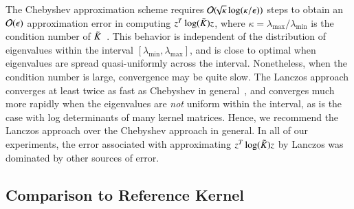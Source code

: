 The Chebyshev approximation scheme requires $\mathcal{O}(\!\!\sqrt{\kappa}
\log(\kappa/\epsilon))$ steps to obtain an $\mathcal{O}(\epsilon)$ approximation error
in computing $z^T \log(\tilde{K}_{}) z$, where $\kappa = \lambda_{\max}/\lambda_
{\min}$ is the condition number of $\tilde{K}_{}$~\cite{han2015large}. This behavior
is independent of the distribution of eigenvalues within the interval $[\lambda_
{\min}, \lambda_{\max}]$, and is close to optimal when eigenvalues are spread
quasi-uniformly across the interval. Nonetheless, when the condition number is
large, convergence may be quite slow.  The Lanczos approach converges at least
twice as fast as Chebyshev in general~\cite[Remark 1]{ubarufast}, and converges
much more rapidly when the eigenvalues are {\em not} uniform within the
interval, as is the case with log determinants of many kernel matrices.  Hence,
we recommend the Lanczos approach over the Chebyshev approach in general.  In
all of our experiments, the error associated with approximating $z^T \log(\tilde{K}_{}) z$ by Lanczos was dominated by other sources of error.

\subsection{Comparison to Reference Kernel}
\label{sup:refkernel}

